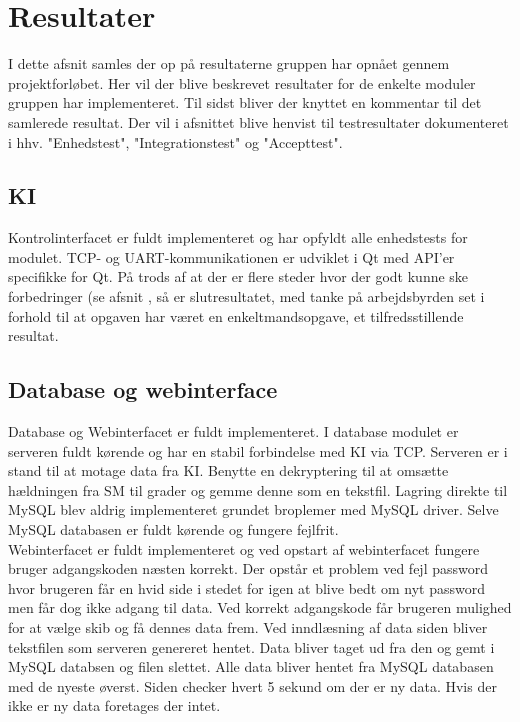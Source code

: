 \section{Resultater}
I dette afsnit samles der op på resultaterne gruppen har opnået gennem projektforløbet. Her vil der blive beskrevet resultater for de enkelte moduler gruppen har implementeret. Til sidst bliver der knyttet en kommentar til det samlerede resultat. Der vil i afsnittet blive henvist til testresultater dokumenteret i hhv. "Enhedstest", "Integrationstest" og "Accepttest".

\subsection{KI}
Kontrolinterfacet er fuldt implementeret og har opfyldt alle enhedstests for modulet. TCP- og UART-kommunikationen er udviklet i Qt med API'er specifikke for Qt. På trods af at der er flere steder hvor der godt kunne ske forbedringer (se afsnit , så er slutresultatet, med tanke på arbejdsbyrden set i forhold til at opgaven har været en enkeltmandsopgave, et tilfredsstillende resultat.\\

\subsection{Database og webinterface}
Database og Webinterfacet er fuldt implementeret. I database modulet er serveren fuldt kørende og har en stabil forbindelse med KI via TCP. Serveren er i stand til at motage data fra KI. Benytte en dekryptering til at omsætte hældningen fra SM til grader og gemme denne som en tekstfil. Lagring direkte til MySQL blev aldrig implementeret grundet broplemer med MySQL driver. Selve MySQL databasen er fuldt kørende og fungere fejlfrit. \\
Webinterfacet er fuldt implementeret og ved opstart af webinterfacet fungere bruger adgangskoden næsten korrekt. Der opstår et problem ved fejl password hvor brugeren får en hvid side i stedet for igen at blive bedt om nyt password men får dog ikke adgang til data. Ved korrekt adgangskode får brugeren mulighed for at vælge skib og få dennes data frem. Ved inndlæsning af data siden bliver tekstfilen som serveren genereret hentet. Data bliver taget ud fra den og gemt i MySQL databsen og filen slettet. Alle data bliver hentet fra MySQL databasen med de nyeste øverst. Siden checker hvert 5 sekund om der er ny data. Hvis der ikke er ny data foretages der intet.

